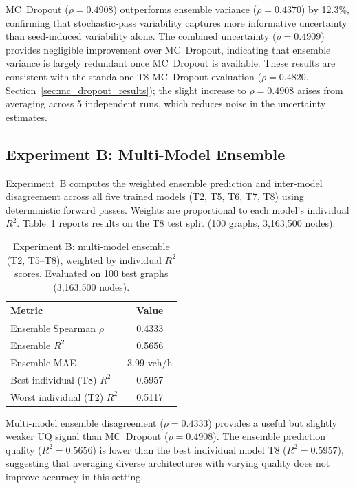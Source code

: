 MC~Dropout ($\rho = 0.4908$) outperforms ensemble variance ($\rho = 0.4370$) by 12.3\%, confirming that stochastic-pass variability captures more informative uncertainty than seed-induced variability alone.  The combined uncertainty ($\rho = 0.4909$) provides negligible improvement over MC~Dropout, indicating that ensemble variance is largely redundant once MC~Dropout is available.  These results are consistent with the standalone T8 MC~Dropout evaluation ($\rho = 0.4820$, Section~\ref{sec:mc_dropout_results}); the slight increase to $\rho = 0.4908$ arises from averaging across 5 independent runs, which reduces noise in the uncertainty estimates.

\subsection{Experiment B: Multi-Model Ensemble}

Experiment~B computes the weighted ensemble prediction and inter-model disagreement across all five trained models (T2, T5, T6, T7, T8) using deterministic forward passes.  Weights are proportional to each model's individual $R^2$.  Table~\ref{tab:exp_b_uq} reports results on the T8 test split (100 graphs, 3,163,500 nodes).

\begin{table}[htbp]
\centering
\caption[Experiment B: Multi-model ensemble uncertainty quality]{Experiment B: multi-model ensemble (T2, T5--T8), weighted by individual $R^2$ scores.  Evaluated on 100 test graphs (3,163,500 nodes).}
\label{tab:exp_b_uq}
\begin{tabular}{lc}
\toprule
\textbf{Metric} & \textbf{Value} \\
\midrule
Ensemble Spearman $\rho$ & 0.4333 \\
Ensemble $R^2$ & 0.5656 \\
Ensemble MAE & 3.99 veh/h \\
Best individual (T8) $R^2$ & 0.5957 \\
Worst individual (T2) $R^2$ & 0.5117 \\
\bottomrule
\end{tabular}
\end{table}

Multi-model ensemble disagreement ($\rho = 0.4333$) provides a useful but slightly weaker UQ signal than MC~Dropout ($\rho = 0.4908$).  The ensemble prediction quality ($R^2 = 0.5656$) is lower than the best individual model T8 ($R^2 = 0.5957$), suggesting that averaging diverse architectures with varying quality does not improve accuracy in this setting.

